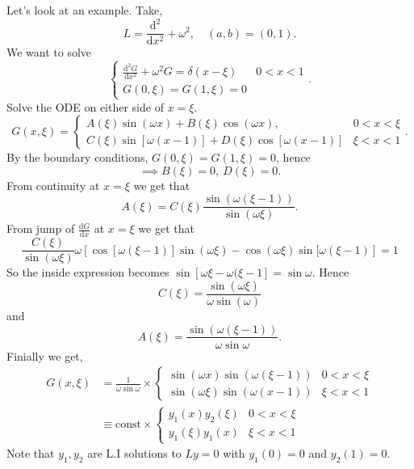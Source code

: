 \documentclass{article}
\begin{document}
Let's look at an example. Take,
\[
	L=\frac{\mathrm d^2}{\mathrm dx^2}+\omega^2,\quad (a,b)=(0,1).
\]
We want to solve
\[
  \begin{cases}
	  \frac{\mathrm d^2G}{\mathrm dx^2}+\omega^2 G=\delta(x-\xi) & 0<x<1 \\
	  G(0,\xi)=G(1,\xi)=0
  \end{cases}.
\]
Solve the ODE on either side of $ x=\xi $.
\[
  G(x,\xi)=\begin{cases}
	  A(\xi)\sin(\omega x)+B(\xi)\cos(\omega x), & 0<x< \xi \\
	  C(\xi)\sin[\omega(x-1)]+D(\xi)\cos[\omega(x-1)] & \xi < x < 1
  \end{cases}.
\]
By the boundary conditions, $ G(0,\xi)=G(1,\xi)=0 $, hence
\[
  \implies B(\xi)=0,\ D(\xi) = 0.
\]
From continuity at $ x=\xi $ we get that 
\[
	A(\xi)=C(\xi)\frac{\sin(\omega(\xi-1))}{\sin(\omega\xi)}.
\]
From jump of $ \frac{\mathrm dG}{\mathrm dx} $ at $ x=\xi $ we get that
\[
	\frac{C(\xi)}{\sin(\omega\xi)}\omega\left[\cos[\omega(\xi-1)]\sin(\omega\xi)-\cos(\omega \xi)\sin[\omega(\xi-1)\right]=1
\]
So the inside expression becomes $ \sin[\omega\xi-\omega(\xi-1]=\sin \omega $.
Hence
\[
	C(\xi)=\frac{\sin(\omega\xi)}{\omega\sin(\omega)}
\]
and
\[
	A(\xi) = \frac{\sin(\omega(\xi-1))}{\omega\sin\omega}.
\]
Finially we get,
\begin{align*}
	G(x,\xi)&=\frac{1}{\omega\sin\omega}\times \begin{cases}
		\sin(\omega x)\sin(\omega(\xi-1)) & 0< x < \xi \\
		\sin(\omega\xi)\sin(\omega(x-1)) & \xi < x < 1
	\end{cases}\\
		&\equiv \text{const} \times \begin{cases}
			y_1(x)y_2(\xi) & 0< x < \xi\\
			y_1(\xi)y_1(x) & \xi < x < 1
		\end{cases}
\end{align*}
Note that $ y_1,y_2 $ are L.I solutions to $ Ly=0 $ with $ y_1(0)=0 $ and $ y_2(1)=0 $.
\end{document}
